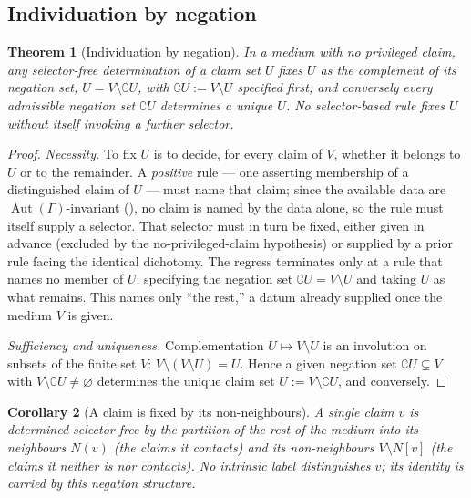 \documentclass[11pt,twocolumn,a4paper]{article}
\theoremstyle{thmstyle}
\newtheorem{theorem}{Theorem}[section]
\newtheorem{corollary}[theorem]{Corollary}
\theoremstyle{definition}
\theoremstyle{remark}
\newcommand{\Gph}{\Gamma}
\newcommand{\V}{V}
\newcommand{\co}{\complement}
\begin{document}
\subsection{Individuation by negation}

\begin{theorem}[Individuation by negation]
\label{thm:negation}
In a medium with no privileged claim, any selector-free determination of a
claim set $U$ fixes $U$ as the complement of its negation set,
$U=\V\setminus\co U$, with $\co U:=\V\setminus U$ specified first; and
conversely every admissible negation set $\co U$ determines a unique $U$.
No selector-based rule fixes $U$ without itself invoking a further
selector.
\end{theorem}

\begin{proof}
\emph{Necessity.} To fix $U$ is to decide, for every claim of $\V$, whether
it belongs to $U$ or to the remainder. A \emph{positive} rule --- one
asserting membership of a distinguished claim of $U$ --- must name that
claim; since the available data are $\operatorname{Aut}(\Gph)$-invariant
(), no claim is named by the data alone, so the rule
must itself supply a selector. That selector must in turn be fixed, either
given in advance (excluded by the no-privileged-claim hypothesis) or
supplied by a prior rule facing the identical dichotomy. The regress
terminates only at a rule that names no member of $U$: specifying the
negation set $\co U=\V\setminus U$ and taking $U$ as what remains. This
names only ``the rest,'' a datum already supplied once the medium $\V$ is
given.

\emph{Sufficiency and uniqueness.} Complementation $U\mapsto\V\setminus U$
is an involution on subsets of the finite set $\V$: $\V\setminus(\V
\setminus U)=U$. Hence a given negation set $\co U\subsetneq\V$ with
$\V\setminus\co U\neq\varnothing$ determines the unique claim set
$U:=\V\setminus\co U$, and conversely.
\end{proof}

\begin{corollary}[A claim is fixed by its non-neighbours]
\label{cor:claim-negation}
A single claim $v$ is determined selector-free by the partition of the
rest of the medium into its neighbours $N(v)$ (the claims it contacts) and
its non-neighbours $\V\setminus N[v]$ (the claims it neither is nor
contacts). No intrinsic label distinguishes $v$; its identity is carried
by this negation structure.
\end{corollary}
\end{document}
